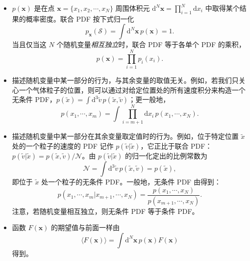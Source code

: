 \begin{itemize}[itemsep=0.45em,topsep=0.4em]
  \item {} $p(\bm{x})$ 是在点 $\bm{x}=\{x_1,x_2,\cdots,x_N\}$ 周围体积元 $\mathrm{d}^N\bm{x}=\prod_{i=1}^{N}\mathrm{d}x_i$ 中取得某个结果的概率密度。联合 PDF 按下式归一化
  \begin{equation}\label{eq:2.32}
    p_{\bm{x}}(\mathscr{S})=\int\mathrm{d}^N\bm{x}\,p(\bm{x})=1.
  \end{equation}
  当且仅当这 $N$ 个随机变量\emph{相互独立}时，联合 PDF 等于各单个 PDF 的乘积，
  \begin{equation}\label{eq:2.33}
    p(\bm{x})=\prod_{i=1}^{N}p_i(x_i).
  \end{equation}

  \item {}描述随机变量中某一部分的行为，与其余变量的取值无关。例如，若我们只关心一个气体粒子的位置，则可以通过对给定位置处的所有速度积分来构造一个无条件 PDF，$p(\tilde x)=\int\mathrm{d}^3\tilde v\,p(\tilde x,\tilde v)$；更一般地，
  \begin{equation}\label{eq:2.34}
    p(x_1,\cdots,x_m)=\int\prod_{i=m+1}^{N}\mathrm{d}x_i\,p(x_1,\cdots,x_N).
  \end{equation}

  \item {}描述随机变量中某一部分在其余变量取定值时的行为。例如，位于特定位置 $\tilde x$ 处的一个粒子的速度的 PDF 记作 $p(\tilde v|\tilde x)$，它正比于联合 PDF：$p(\tilde v|\tilde x)=p(\tilde x,\tilde v)/\mathcal{N}$。由 $p(\tilde v|\tilde x)$ 的归一化定出的比例常数为
  \begin{equation}\label{eq:2.35}
    \mathcal{N}=\int\mathrm{d}^3\tilde v\,p(\tilde x,\tilde v)=p(\tilde x),
  \end{equation}
  即位于 $\tilde x$ 处一个粒子的无条件 PDF。一般地，无条件 PDF 由得到：
  \begin{equation}\label{eq:2.36}
    p(x_1,\cdots,x_m|x_{m+1},\cdots,x_N)=\frac{p(x_1,\cdots,x_N)}{p(x_{m+1},\cdots,x_N)}.
  \end{equation}
  注意，若随机变量相互独立，则无条件 PDF 等于条件 PDF。

  \item 函数 $F(\bm{x})$ 的期望值与前面一样由
  \begin{equation}\label{eq:2.37}
    \langle F(\bm{x})\rangle=\int\mathrm{d}^N\bm{x}\,p(\bm{x})F(\bm{x})
  \end{equation}
  得到。


\end{itemize}
